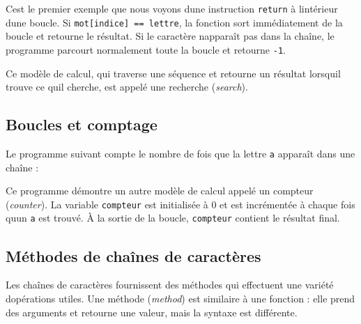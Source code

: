 C\textquotesingle est le premier exemple que nous voyons
d\textquotesingle une instruction \texttt{return} à
l\textquotesingle intérieur d\textquotesingle une boucle. Si
\texttt{mot{[}indice{]}\ ==\ lettre}, la fonction sort immédiatement de
la boucle et retourne le résultat. Si le caractère
n\textquotesingle apparaît pas dans la chaîne, le programme parcourt
normalement toute la boucle et retourne \texttt{-1}.

Ce modèle de calcul, qui traverse une séquence et retourne un résultat
lorsqu\textquotesingle il trouve ce qu\textquotesingle il cherche, est
appelé une recherche (\emph{search}).

\hypertarget{boucles-et-comptage}{%
\subsection{Boucles et comptage}\label{boucles-et-comptage}}

Le programme suivant compte le nombre de fois que la lettre \texttt{a}
apparaît dans une chaîne :

\begin{Shaded}
\begin{Highlighting}[]
\OperatorTok{=} 
\OperatorTok{=} 
    \OperatorTok{==} \NormalTok{:}
\OperatorTok{=}\OperatorTok{+} 
\end{Highlighting}
\end{Shaded}

Ce programme démontre un autre modèle de calcul appelé un compteur
(\emph{counter}). La variable \texttt{compteur} est initialisée à 0 et
est incrémentée à chaque fois qu\textquotesingle un \texttt{a} est
trouvé. À la sortie de la boucle, \texttt{compteur} contient le résultat
final.

\hypertarget{muxe9thodes-de-chauxeenes-de-caractuxe8res}{%
\subsection{Méthodes de chaînes de
caractères}\label{muxe9thodes-de-chauxeenes-de-caractuxe8res}}

Les chaînes de caractères fournissent des méthodes qui effectuent une
variété d\textquotesingle opérations utiles. Une méthode (\emph{method})
est similaire à une fonction : elle prend des arguments et retourne une
valeur, mais la syntaxe est différente.

